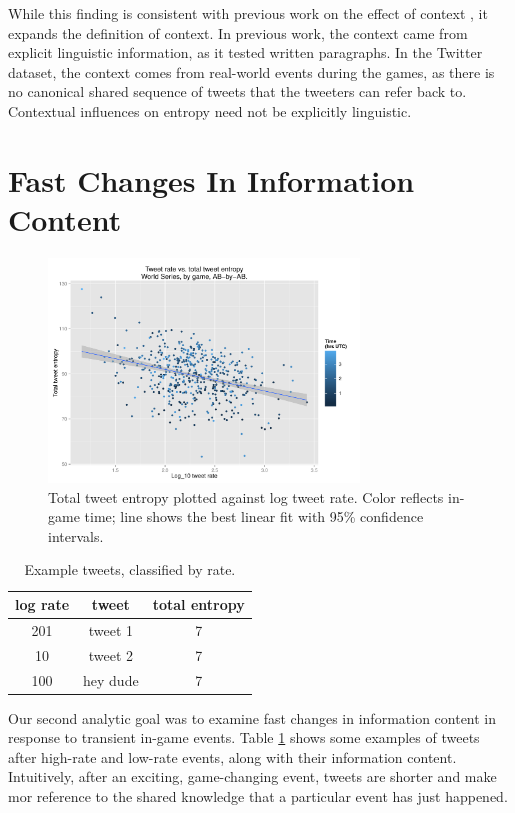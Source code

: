 \documentclass[11pt,letterpaper]{article}
\begin{document}
While this finding is consistent with previous work on the effect of context \cite{genzel2002,qian2012}, it expands the definition of context.  In previous work, the context came from explicit linguistic information, as it tested written paragraphs.  In the Twitter dataset, the context comes from real-world events during the games, as there is no canonical shared sequence of tweets that the tweeters can refer back to.  Contextual influences on entropy need not be explicitly linguistic.

\section{Fast Changes In Information Content}

\begin{figure}
 \centering
  \includegraphics[width=3.25in]{figures/rate-total-ent-agg}
 \caption{Total tweet entropy plotted against log tweet rate. Color reflects in-game time; line shows the best linear fit with 95\% confidence intervals.}\label{fig:time-perword-ent}\vspace*{-.5em}
\end{figure}

\begin{table}
  \begin{tabular}{ccc}
log rate & tweet & total entropy \\
\hline
201 & tweet 1 & 7\\
10 & tweet 2 & 7\\
100 & hey dude & 7\\
\hline
  \end{tabular}
 \caption{Example tweets, classified by rate.}\label{tab:ex2}
\end{table}
Our second analytic goal was to examine fast changes in information content in response to transient in-game events. Table \ref{tab:ex2} shows some examples of tweets after high-rate and low-rate events, along with their information content. Intuitively, after an exciting, game-changing event, tweets are shorter and make mor reference to the shared knowledge that a particular event has just happened. 
\end{document}
